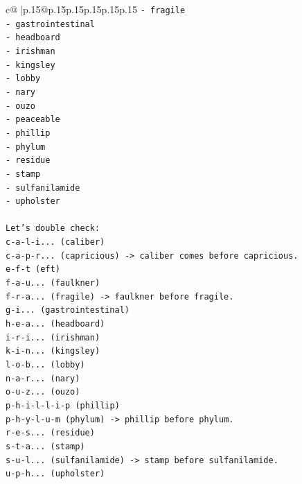 \documentclass{article}
\begin{document}
{\begin{supertabular}{c@{$\;$}|p{.15\linewidth}@{}p{.15\linewidth}p{.15\linewidth}p{.15\linewidth}p{.15\linewidth}p{.15\linewidth}}
{{{\texttt{{-} fragile} \\
\texttt{{-} gastrointestinal} \\
\texttt{{-} headboard} \\
\texttt{{-} irishman} \\
\texttt{{-} kingsley} \\
\texttt{{-} lobby} \\
\texttt{{-} nary} \\
\texttt{{-} ouzo} \\
\texttt{{-} peaceable} \\
\texttt{{-} phillip} \\
\texttt{{-} phylum} \\
\texttt{{-} residue} \\
\texttt{{-} stamp} \\
\texttt{{-} sulfanilamide} \\
\texttt{{-} upholster} \\
\\ 
\texttt{Let's double check:} \\
\texttt{c{-}a{-}l{-}i... (caliber)} \\
\texttt{c{-}a{-}p{-}r... (capricious) {-}> caliber comes before capricious.} \\
\texttt{e{-}f{-}t (eft)} \\
\texttt{f{-}a{-}u... (faulkner)} \\
\texttt{f{-}r{-}a... (fragile) {-}> faulkner before fragile.} \\
\texttt{g{-}i... (gastrointestinal)} \\
\texttt{h{-}e{-}a... (headboard)} \\
\texttt{i{-}r{-}i... (irishman)} \\
\texttt{k{-}i{-}n... (kingsley)} \\
\texttt{l{-}o{-}b... (lobby)} \\
\texttt{n{-}a{-}r... (nary)} \\
\texttt{o{-}u{-}z... (ouzo)} \\
\texttt{p{-}h{-}i{-}l{-}l{-}i{-}p (phillip)} \\
\texttt{p{-}h{-}y{-}l{-}u{-}m (phylum) {-}> phillip before phylum.} \\
\texttt{r{-}e{-}s... (residue)} \\
\texttt{s{-}t{-}a... (stamp)} \\
\texttt{s{-}u{-}l... (sulfanilamide) {-}> stamp before sulfanilamide.} \\
\texttt{u{-}p{-}h... (upholster)} \\
}}}
\end{supertabular}}
\end{document}
